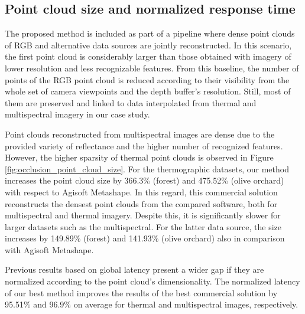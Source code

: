 
\subsection{Point cloud size and normalized response time}

The proposed method is included as part of a pipeline where dense point clouds of RGB and alternative data sources are jointly reconstructed. In this scenario, the first point cloud is considerably larger than those obtained with imagery of lower resolution and less recognizable features. From this baseline, the number of points of the RGB point cloud is reduced according to their visibility from the whole set of camera viewpoints and the depth buffer's resolution. Still, most of them are preserved and linked to data interpolated from thermal and multispectral imagery in our case study. 

Point clouds reconstructed from multispectral images are dense due to the provided variety of reflectance and the higher number of recognized features. However, the higher sparsity of thermal point clouds is observed in Figure \ref{fig:occlusion_point_cloud_size}. For the thermographic datasets, our method increases the point cloud size by 366.3\% (forest) and 475.52\% (olive orchard) with respect to Agisoft Metashape. In this regard, this commercial solution reconstructs the densest point clouds from the compared software, both for multispectral and thermal imagery. Despite this, it is significantly slower for larger datasets such as the multispectral. For the latter data source, the size increases by 149.89\% (forest) and 141.93\% (olive orchard) also in comparison with Agisoft Metashape.

Previous results based on global latency present a wider gap if they are normalized according to the point cloud's dimensionality. The normalized latency of our best method improves the results of the best commercial solution by 95.51\% and 96.9\% on average for thermal and multispectral images, respectively. 


